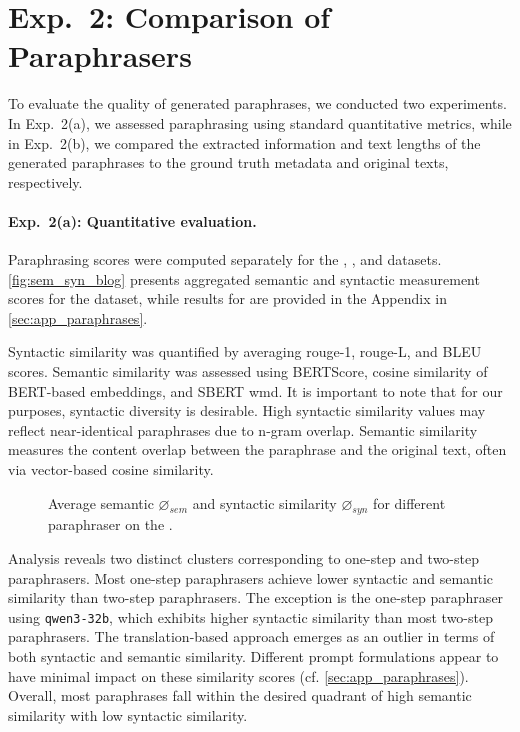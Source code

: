 \section{Exp.\ 2: Comparison of Paraphrasers}
\label{sec:comp_paraphrases}

To evaluate the quality of generated paraphrases, we conducted two experiments. 
In Exp.\ 2(a), we assessed paraphrasing using standard quantitative metrics, while in Exp.\ 2(b), we compared the extracted information and text lengths of the generated paraphrases to the ground truth metadata and original texts, respectively.

\paragraph{Exp.\ 2(a): Quantitative evaluation.}

Paraphrasing scores were computed separately for the \dataBlog{}, \dataGutenberg{}, and \dataStudent{} datasets. 
\autoref{fig:sem_syn_blog} presents aggregated semantic and syntactic measurement scores for the \dataBlog{} dataset, while results for \dataGutenberg{} are provided in the Appendix in \autoref{sec:app_paraphrases}.

Syntactic similarity was quantified by averaging \ac{rouge}-1, \ac{rouge}-L, and BLEU scores. 
Semantic similarity was assessed using BERTScore, cosine similarity of BERT-based embeddings, and SBERT \ac{wmd}. 
It is important to note that for our purposes, syntactic diversity is desirable.
High syntactic similarity values may reflect near-identical paraphrases due to n-gram overlap. 
Semantic similarity measures the content overlap between the paraphrase and the original text, often via vector-based cosine similarity. 

\begin{figure}[htbp]
    \centering
    
    \caption[Comparison of paraphrasers on the \dataBlog{} dataset.]{Average semantic $\diameter_{sem}$ and syntactic similarity $\diameter_{syn}$ for different paraphraser on the \dataBlog{}.}
    \label{fig:sem_syn_blog}
\end{figure}


Analysis reveals two distinct clusters corresponding to one-step and two-step paraphrasers. 
Most one-step paraphrasers achieve lower syntactic and semantic similarity than two-step paraphrasers. 
The exception is the one-step paraphraser using \texttt{qwen3-32b}, which exhibits higher syntactic similarity than most two-step paraphrasers. 
The translation-based approach emerges as an outlier in terms of both syntactic and semantic similarity. 
Different prompt formulations appear to have minimal impact on these similarity scores (cf. \autoref{sec:app_paraphrases}). 
Overall, most paraphrases fall within the desired quadrant of high semantic similarity with low syntactic similarity.



